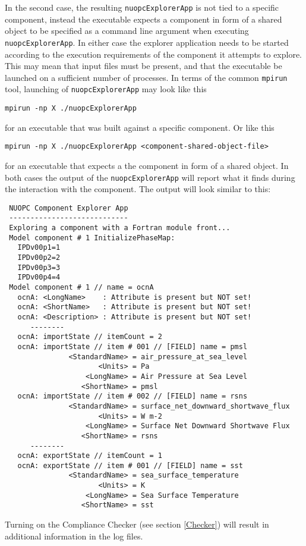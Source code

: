In the second case, the resulting {\tt nuopcExplorerApp} is not tied to a specific component, instead the executable expects a component in form of a shared object to be specified as a command line argument when executing {\tt nuopcExplorerApp}. In either case the explorer application needs to be started according to the execution requirements of the component it attempts to explore. This may mean that input files must be present, and that the executable be launched on a sufficient number of processes. In terms of the common {\tt mpirun} tool, launching of {\tt nuopcExplorerApp} may look like this
\begin{verbatim}
mpirun -np X ./nuopcExplorerApp
\end{verbatim}
for an executable that was built against a specific component. Or like this
\begin{verbatim}
mpirun -np X ./nuopcExplorerApp <component-shared-object-file>
\end{verbatim}
for an executable that expects a the component in form of a shared object. In both cases the output of the {\tt nuopcExplorerApp} will report what it finds during the interaction with the component. The output will look similar to this:

\begin{verbatim}
 NUOPC Component Explorer App
 ----------------------------
 Exploring a component with a Fortran module front...
 Model component # 1 InitializePhaseMap:
   IPDv00p1=1
   IPDv00p2=2
   IPDv00p3=3
   IPDv00p4=4
 Model component # 1 // name = ocnA
   ocnA: <LongName>    : Attribute is present but NOT set!
   ocnA: <ShortName>   : Attribute is present but NOT set!
   ocnA: <Description> : Attribute is present but NOT set!
      --------
   ocnA: importState // itemCount = 2
   ocnA: importState // item # 001 // [FIELD] name = pmsl
               <StandardName> = air_pressure_at_sea_level
                      <Units> = Pa
                   <LongName> = Air Pressure at Sea Level
                  <ShortName> = pmsl
   ocnA: importState // item # 002 // [FIELD] name = rsns
               <StandardName> = surface_net_downward_shortwave_flux
                      <Units> = W m-2
                   <LongName> = Surface Net Downward Shortwave Flux
                  <ShortName> = rsns
      --------
   ocnA: exportState // itemCount = 1
   ocnA: exportState // item # 001 // [FIELD] name = sst
               <StandardName> = sea_surface_temperature
                      <Units> = K
                   <LongName> = Sea Surface Temperature
                  <ShortName> = sst
\end{verbatim}

Turning on the Compliance Checker (see section \ref{Checker}) will result in additional information in the log files.







